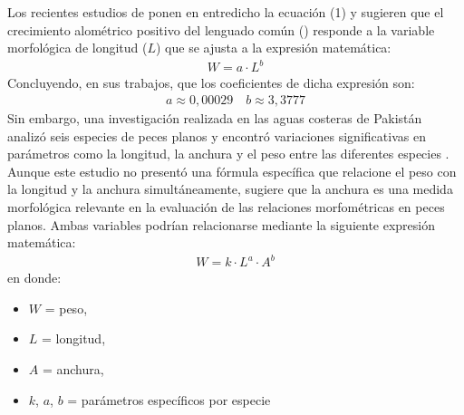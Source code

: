 \documentclass[a4paper,10pt,spanish]{jupyterBook}
\begin{document}
\sphinxAtStartPar
Los recientes estudios de  ponen en entredicho la ecuación (1) y sugieren que el crecimiento alométrico positivo del lenguado común () responde a la variable morfológica de longitud (\(L\)) que se ajusta a la expresión matemática:
\begin{equation}\label{equation:content/03/Coeficientes:eq_peso-longitud}
\begin{split}W=a\cdot L^b\end{split}
\end{equation}
\sphinxAtStartPar
Concluyendo, en sus trabajos, que los coeficientes de dicha expresión son:
\begin{equation*}
\begin{split}a\approx0,00029\quad b\approx3,3777\end{split}
\end{equation*}
\sphinxAtStartPar
Sin embargo, una investigación realizada en las aguas costeras de Pakistán analizó seis especies de peces planos y encontró variaciones significativas en parámetros como la longitud, la anchura y el peso entre las diferentes especies .  Aunque este estudio no presentó una fórmula específica que relacione el peso con la longitud y la anchura simultáneamente, sugiere que la anchura es una medida morfológica relevante en la evaluación de las relaciones morfométricas en peces planos. Ambas variables podrían relacionarse mediante la siguiente expresión matemática:
\begin{equation}\label{equation:content/03/Coeficientes:eq_peso-longitud_anchura}
\begin{split}W=k\cdot L^a \cdot A^b\end{split}
\end{equation}
\sphinxAtStartPar
en donde:
\begin{itemize}
\item {}
\sphinxAtStartPar
\(W\) = peso,

\item {}
\sphinxAtStartPar
\(L\) = longitud,

\item {}
\sphinxAtStartPar
\(A\) = anchura,

\item {}
\sphinxAtStartPar
\(k\), \(a\), \(b\) = parámetros específicos por especie

\end{itemize}
\end{document}
